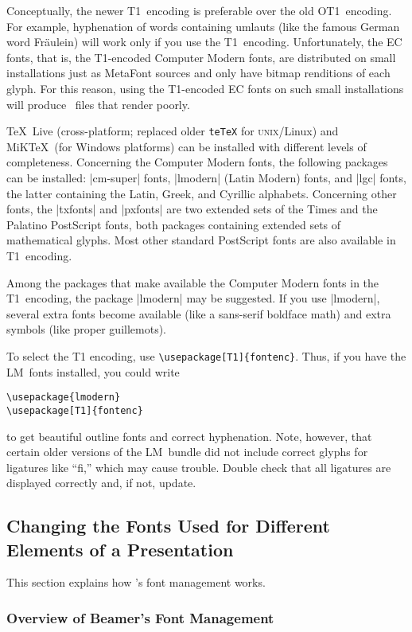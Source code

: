 Conceptually, the newer T1~encoding is preferable over the old OT1~encoding. For example, hyphenation of words containing umlauts (like the famous German word Fr\"aulein) will work only if you use the T1~encoding. Unfortunately, the EC fonts, that is, the T1-encoded Computer Modern fonts, are distributed on small installations just as MetaFont sources and only have bitmap renditions of each glyph. For this reason, using the T1-encoded EC fonts on such small installations will produce \pdf\ files that render poorly.

\TeX\ Live (cross-platform; replaced older \texttt{teTeX} for \textsc{unix}\slash Linux) and MiK\TeX\ (for Windows platforms) can be installed with different levels of completeness. Concerning the Computer Modern fonts, the following packages can be installed: |cm-super| fonts, |lmodern| (Latin Modern) fonts, and |lgc| fonts, the latter containing the Latin, Greek, and Cyrillic alphabets. Concerning other fonts, the |txfonts| and |pxfonts| are two extended sets of the Times and the Palatino PostScript fonts, both packages containing extended sets of mathematical glyphs. Most other standard PostScript fonts are also available in T1~encoding.

Among the packages that make available the Computer Modern fonts in the T1~encoding, the package |lmodern| may be suggested. If you use |lmodern|, several extra fonts become available (like a sans-serif boldface math) and extra symbols (like proper guillemots).

To select the T1 encoding, use \verb|\usepackage[T1]{fontenc}|. Thus, if you have the LM~fonts installed, you could write
\begin{verbatim}
\usepackage{lmodern}
\usepackage[T1]{fontenc}
\end{verbatim}
to get beautiful outline fonts and correct hyphenation. Note, however, that certain older versions of the LM~bundle did not include correct glyphs for ligatures like ``fi,'' which may cause trouble. Double check that all ligatures are displayed correctly and, if not, update.


\subsection{Changing the Fonts Used for Different Elements of a Presentation}

This section explains how \beamer's font management works.

\subsubsection{Overview of Beamer's Font Management}

